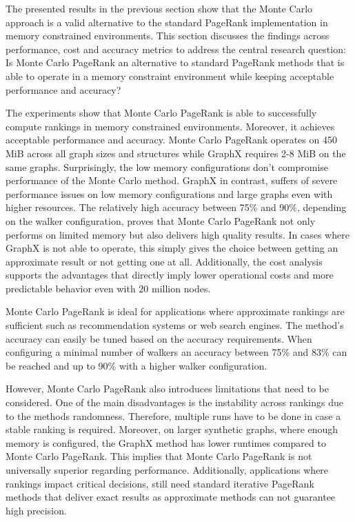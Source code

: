 The presented results in the previous section show that the Monte Carlo approach is a valid alternative to the standard PageRank implementation in memory constrained environments. This section discusses the findings across performance, cost and accuracy metrics to address the central research question: Is Monte Carlo PageRank an alternative to standard PageRank methods that is able to operate in a memory constraint environment while keeping acceptable performance and accuracy?\par

The experiments show that Monte Carlo PageRank is able to successfully compute rankings in memory constrained environments. Moreover, it achieves acceptable performance and accuracy. Monte Carlo PageRank operates on 450 MiB across all graph sizes and structures while GraphX requires 2-8 MiB on the same graphs. Surprisingly, the low memory configurations don't compromise performance of the Monte Carlo method. GraphX in contrast, suffers of severe performance issues on low memory configurations and large graphs even with higher resources. The relatively high accuracy between 75\% and 90\%, depending on the walker configuration, proves that Monte Carlo PageRank not only performs on limited memory but also delivers high quality results. In cases where GraphX is not able to operate, this simply gives the choice between getting an approximate result or not getting one at all. Additionally, the cost analysis supports the advantages that directly imply lower operational costs and more predictable behavior even with 20 million nodes. \par

Monte Carlo PageRank is ideal for applications where approximate rankings are sufficient such as recommendation systems or web search engines. The method's accuracy can easily be tuned based on the accuracy requirements. When configuring a minimal number of walkers an accuracy between 75\% and 83\% can be reached and up to 90\% with a higher walker configuration. \par  

However, Monte Carlo PageRank also introduces limitations that need to be considered. One of the main disadvantages is the instability across rankings due to the methods randomness. Therefore, multiple runs have to be done in case a stable ranking is required. Moreover, on larger synthetic graphs, where enough memory is configured, the GraphX method has lower runtimes compared to Monte Carlo PageRank. This implies that Monte Carlo PageRank is not universally superior regarding performance. Additionally, applications where rankings impact critical decisions, still need standard iterative PageRank methods that deliver exact results as approximate methods can not guarantee high precision. \par

